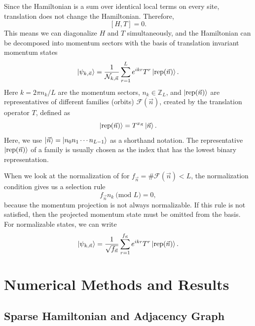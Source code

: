 \documentclass[%
 reprint,
 amsmath,amssymb,
 aps,
]{revtex4-2}
\begin{document}
Since the Hamiltonian is a sum over identical local terms on every site,
translation does not change the Hamiltonian. Therefore,
\[
[H,T]=0 .
\]
This means we can diagonalize $H$ and $T$ simultaneously, and the Hamiltonian can be decomposed into momentum sectors with the basis of translation invariant momentum states
\begin{equation}
    \ket{\psi_{k,\vec{n}}} = \frac{1}{\mathcal{N}_{k,\vec{n}}} \sum_{r=1}^{L} e^{ikr} T^r \ket{\operatorname{rep}(\vec{n})}. \label{eq:momentum_state_basis}
\end{equation}
Here $k = 2\pi n_k/L$ are the momentum sectors, $n_k \in \mathbb{Z}_L$, and $\ket{\text{rep}(\vec{n})}$ are representatives of different families (orbits) $\mathcal{F}(\vec{n})$, created by the translation operator $T$, defined as
\begin{equation}
    \ket{\text{rep}(\vec{n})} = T^{x_{\vec{n}}} \ket{\vec{n}}.
\end{equation}
Here, we use $\ket{\vec{n}} = \ket{n_0n_1\cdots n_{L-1}}$ as a shorthand notation. The representative $\ket{\text{rep}(\vec{n})}$ of a family is usually chosen as the index that has the lowest binary representation.

When we look at the normalization of  for $f_{\vec{n}} = \# \mathcal{F}(\vec{n}) < L$, the normalization condition gives us a selection rule 
\begin{equation}
    f_{\vec{n}}n_k \ \text{(mod $L$)} = 0, \label{eq:normalizationcond}
\end{equation}
because the momentum projection is not always normalizable. If this rule is not satisfied, then the projected momentum state must be omitted from the basis. For normalizable states, we can write
\begin{equation}
    \ket{\psi_{k,\vec{n}}} = \frac{1}{\sqrt{f_{\vec{n}}}} \sum_{r=1}^{f_{\vec{n}}} e^{ikr} T^r \ket{\operatorname{rep}(\vec{n})}. \label{eq:momentum_state_basis_normalized}
\end{equation}

\section{\label{sec:Num_methods}Numerical Methods \MakeLowercase{and} Results}

\subsection{\label{sec:sparse_h_adj_gr}Sparse Hamiltonian and Adjacency Graph}
\end{document}
